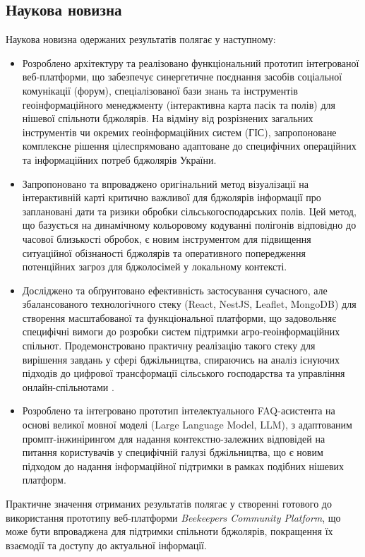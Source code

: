 \subsection*{Наукова новизна}
Наукова новизна одержаних результатів полягає у наступному:
\begin{itemize}
    \item Розроблено архітектуру та реалізовано функціональний прототип інтегрованої веб-платформи, що забезпечує синергетичне поєднання засобів соціальної комунікації (форум), спеціалізованої бази знань та інструментів геоінформаційного менеджменту (інтерактивна карта пасік та полів) для нішевої спільноти бджолярів. На відміну від розрізнених загальних інструментів чи окремих геоінформаційних систем (ГІС), запропоноване комплексне рішення цілеспрямовано адаптоване до специфічних операційних та інформаційних потреб бджолярів України.
    \item Запропоновано та впроваджено оригінальний метод візуалізації на інтерактивній карті критично важливої для бджолярів інформації про заплановані дати та ризики обробки сільськогосподарських полів. Цей метод, що базується на динамічному кольоровому кодуванні полігонів відповідно до часової близькості обробок, є новим інструментом для підвищення ситуаційної обізнаності бджолярів та оперативного попередження потенційних загроз для бджолосімей у локальному контексті.
    \item Досліджено та обґрунтовано ефективність застосування сучасного, але збалансованого технологічного стеку (React, NestJS, Leaflet, MongoDB) для створення масштабованої та функціональної платформи, що задовольняє специфічні вимоги до розробки систем підтримки агро-геоінформаційних спільнот. Продемонстровано практичну реалізацію такого стеку для вирішення завдань у сфері бджільництва, спираючись на аналіз існуючих підходів до цифрової трансформації сільського господарства та управління онлайн-спільнотами \cite{preece2005onlinecommunities, huet2022digitalbeekeeping, guruprasad2024beeopen}.
    \item Розроблено та інтегровано прототип інтелектуального FAQ-асистента на основі великої мовної моделі (Large Language Model, LLM), з адаптованим промпт-інжинірингом для надання контекстно-залежних відповідей на питання користувачів у специфічній галузі бджільництва, що є новим підходом до надання інформаційної підтримки в рамках подібних нішевих платформ.
\end{itemize}

Практичне значення отриманих результатів полягає у створенні готового до використання прототипу веб-платформи \textit{Beekeepers Community Platform}, що може бути впроваджена для підтримки спільноти бджолярів, покращення їх взаємодії та доступу до актуальної інформації.

